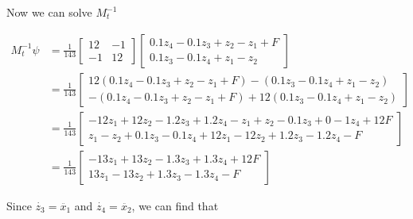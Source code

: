 \documentclass[12pt,a4paper, onecolumn]{exam}
\begin{document}
\begin{questions}
\begin{parts}
\begin{solution}
    Now we can solve $ M_t^{-1} $
    
    \begin{align*}
      M_t^{-1} \psi &= \frac{ 1 }{ 143 } \begin{bmatrix}
          12&-1\\
          -1&12
      \end{bmatrix} \begin{bmatrix}
          0.1z_4 - 0.1z_3 + z_2 - z_1 + F\\
          0.1z_3 - 0.1z_4 + z_1 - z_2 
      \end{bmatrix}\\
      &= \frac{ 1 }{ 143 } \begin{bmatrix}
          12 \left( 0.1z_4 - 0.1z_3 + z_2 - z_1 + F \right) - \left( 0.1z_3 - 0.1z_4 + z_1 - z_2 \right)  \\
          - \left( 0.1z_4 - 0.1z_3 + z_2 - z_1 + F \right) + 12 \left(0.1z_3 - 0.1z_4 + z_1 - z_2 \right)  
      \end{bmatrix}   \\
      &= \frac{ 1 }{ 143 } \begin{bmatrix}
          -12 z_1 + 12 z_2 - 1.2 z_3 + 1.2 z_4 -z_1 + z_2 -0.1z_3 + 0-1z_4 + 12 F\\
          z_1 - z_2 + 0.1z_3 - 0.1z_4 + 12z_1 - 12z_2 + 1.2z_3 - 1.2z_4 - F
      \end{bmatrix} \\
      &= \frac{ 1 }{ 143 } \begin{bmatrix}
          -13z_1 + 13z_2 - 1.3z_3 + 1.3 z_4 + 12F\\
          13z_1 - 13z_2 + 1.3z_3 - 1.3z_4 - F
      \end{bmatrix} 
    \end{align*}

    Since $ \dot{z_3} = \ddot{x_1}$ and $ \dot{z_4} = \ddot{x_2} $, we can find that 
    

\end{solution}
\end{parts}
\end{questions}
\end{document}
